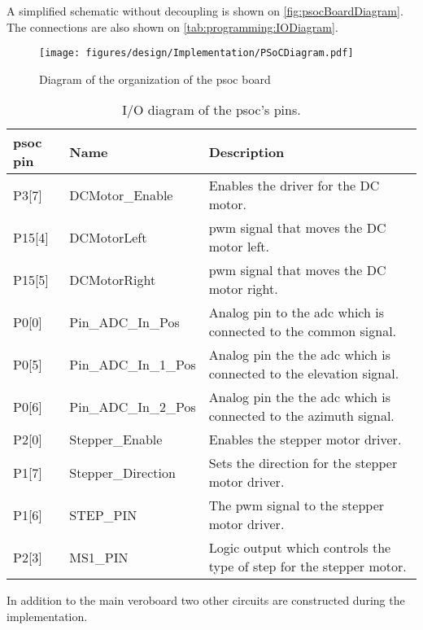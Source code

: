 A simplified schematic without decoupling is shown on \autoref{fig:psocBoardDiagram}. The connections are also shown on \autoref{tab:programming:IODiagram}.

\begin{figure}
	\centering
	\texttt{[image: figures/design/Implementation/PSoCDiagram.pdf]}
	\caption{Diagram of the organization of the \gls{psoc} board}
	\label{fig:psocBoardDiagram}
\end{figure}


\begin{table}
	\centering
	\caption{I/O diagram of the \gls{psoc}'s pins.}
	
	\begin{tabularx}{\textwidth}{l l X}
		\textbf{\gls{psoc} pin} & \textbf{Name} & \textbf{Description}	\\ \toprule \rowcolor{lightGrey} 
		P3[7]&	DCMotor_Enable		& Enables the driver for the DC motor.\\ 
		P15[4]&	DCMotorLeft			& \gls{pwm} signal that moves the DC motor left.\\ \rowcolor{lightGrey} 
		P15[5]&	DCMotorRight		& \gls{pwm} signal that moves the DC motor right.\\ \hline 
		P0[0]&	Pin_ADC_In_Pos		& Analog pin to the \gls{adc} which is connected to the common signal.\\ \rowcolor{lightGrey} 
		P0[5]&	Pin_ADC_In_1_Pos	& Analog pin the the \gls{adc} which is connected to the elevation signal. \\
		P0[6]&	Pin_ADC_In_2_Pos	& Analog pin the the \gls{adc} which is connected to the azimuth signal. \\ \rowcolor{lightGrey}  \hline 
		P2[0]&	Stepper_Enable		& Enables the stepper motor driver. \\ 
		P1[7]&	Stepper_Direction	& Sets the direction for the stepper motor driver. \\ \rowcolor{lightGrey} 
		P1[6]&	STEP_PIN			& The \gls{pwm} signal to the stepper motor driver.\\ 
		P2[3]& 	MS1_PIN				& Logic output which controls the type of step for the stepper motor. \\
	\end{tabularx}
\end{table}\label{tab:programming:IODiagram}

In addition to the main veroboard two other circuits are constructed during the implementation.

